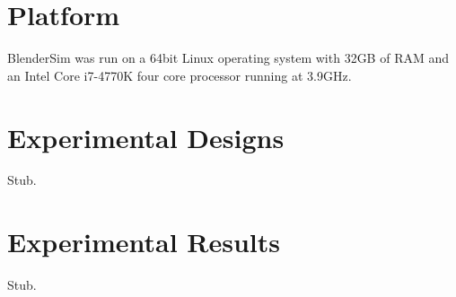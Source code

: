 \section{Platform}

BlenderSim was run on a 64bit Linux operating system with 32GB of RAM and an Intel Core i7-4770K four core processor running at 3.9GHz.

\section{Experimental Designs}

Stub.

\section{Experimental Results}

Stub.
